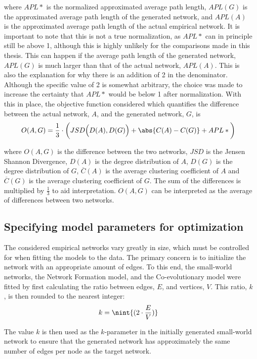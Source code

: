 \documentclass[11pt]{article}
\DeclarePairedDelimiter{\nint}\lfloor\rceil
\DeclarePairedDelimiter{\abs}\lvert\rvert
\begin{document}
where $APL*$ is the normalized approximated average path length, $APL(G)$ is the approximated average path length of the generated network, and $APL(A)$ is the approximated average path length of the actual empirical network. It is important to note that this is not a true normalization, as $APL*$ can in principle still be above 1, although this is highly unlikely for the comparisons made in this thesis. This can happen if the average path length of the generated network, $APL(G)$ is much larger than that of the actual network, $APL(A)$. This is also the explanation for why there is an addition of 2 in the denominator. Although the specific value of 2 is somewhat arbitrary, the choice was made to increase the certainty that $APL*$ would be below 1 after normalization.
With this in place, the objective function considered which quantifies the difference between the actual network, $A$, and the generated network, $G$, is 
$$ O(A, G) = \frac{1}{3} \cdot \bigg(JSD \Big(D(A), D(G) \Big) + \abs{C(A) - C(G)} + APL*\bigg)$$

where $O(A, G)$ is the difference between the two networks, $JSD$ is the Jensen Shannon Divergence, $D(A)$ is the degree distribution of $A$, $D(G)$ is the degree distribution of $G$, $\overline{C}(A)$ is the average clustering coefficient of $A$ and $\overline{C}(G)$ is the average clustering coefficient of $G$. The sum of the differences is multiplied by $\frac{1}{3}$ to aid interpretation. $O(A,G)$ can be interpreted as the average of differences between two networks.

\subsection{Specifying model parameters for optimization}
The considered empirical networks vary greatly in size, which must be controlled for when fitting the models to the data. The primary concern is to initialize the network with an appropriate amount of edges. To this end, the small-world networks, the Network Formation model, and the Co-evolutionary model were fitted by first calculating the ratio between edges, $E$, and vertices, $V$. This ratio, $k$, is then rounded to the nearest integer: 
$$k = \nint{(2 \cdot \frac{E}{V})}$$

The value $k$ is then used as the $k$-parameter in the initially generated small-world network to ensure that the generated network has approximately the same number of edges per node as the target network. 
\end{document}
